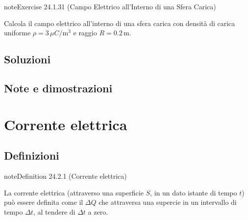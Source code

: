 \documentclass[letterpaper,10pt,italian]{jupyterBook}
\begin{document}
\begin{sphinxadmonition}{note}{Exercise 24.1.31 (Campo Elettrico all’Interno di una Sfera Carica)}



\sphinxAtStartPar
Calcola il campo elettrico all’interno di una sfera carica con densità di carica uniforme \(\rho = 3 \, \mu C/\text{m}^3\) e raggio \(R = 0.2 \, \text{m}\).
\end{sphinxadmonition}



\begin{sphinxVerbatim}[commandchars=\\\{\}]

\end{sphinxVerbatim}

\sphinxstepscope


\subsection{Soluzioni}
\label{\detokenize{ch/electromagnetism/electrostatics-sol:soluzioni}}\label{\detokenize{ch/electromagnetism/electrostatics-sol:physics-hs-electromagnetism-electrostatics-sol}}\label{\detokenize{ch/electromagnetism/electrostatics-sol::doc}}
\sphinxstepscope


\subsection{Note e dimostrazioni}
\label{\detokenize{ch/electromagnetism/electrostatics-notes:note-e-dimostrazioni}}\label{\detokenize{ch/electromagnetism/electrostatics-notes:physics-hs-electromagnetism-electrostatics-notes}}\label{\detokenize{ch/electromagnetism/electrostatics-notes::doc}}


\sphinxstepscope


\section{Corrente elettrica}
\label{\detokenize{ch/electromagnetism/electric-current:corrente-elettrica}}\label{\detokenize{ch/electromagnetism/electric-current:physics-hs-electromagnetism-electric-current}}\label{\detokenize{ch/electromagnetism/electric-current::doc}}



\subsection{Definizioni}
\label{\detokenize{ch/electromagnetism/electric-current:definizioni}}\label{ch/electromagnetism/electric-current:electric-current}
\begin{sphinxadmonition}{note}{Definition 24.2.1 (Corrente elettrica)}



\sphinxAtStartPar
La corrente elettrica (attraverso una superficie \(S\), in un dato istante di tempo \(t\)) può essere definita come il  \(\Delta Q\) che attraversa una supercie in un intervallo di tempo \(\Delta t\), al tendere di \(\Delta t\) a zero.
\end{sphinxadmonition}
\end{document}
